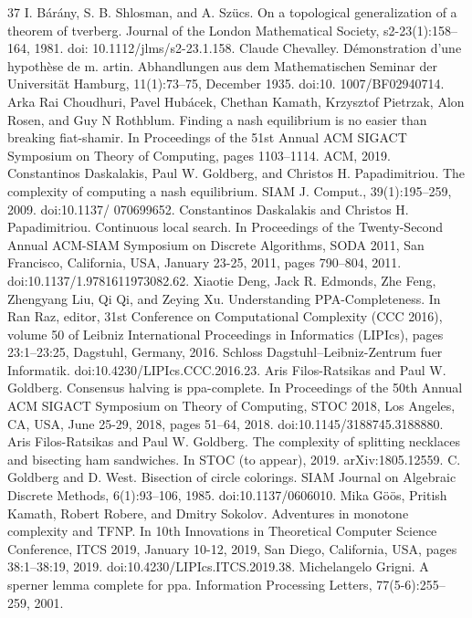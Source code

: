 \documentclass[10pt,a4paper]{article}
\theoremstyle{definition}
\theoremstyle{remark}
\begin{document}
\begin{thebibliography}{37}
 I. Bárány, S. B. Shlosman, and A. Szücs. On a topological generalization of a theorem of tverberg. Journal of the London Mathematical Society, s2-23(1):158–164, 1981. doi: 10.1112/jlms/s2-23.1.158.
 Claude Chevalley. Démonstration d’une hypothèse de m. artin. Abhandlungen aus dem Mathematischen Seminar der Universität Hamburg, 11(1):73–75, December 1935. doi:10. 1007/BF02940714.
 Arka Rai Choudhuri, Pavel Hubácek, Chethan Kamath, Krzysztof Pietrzak, Alon Rosen, and Guy N Rothblum. Finding a nash equilibrium is no easier than breaking fiat-shamir. In Proceedings of the 51st Annual ACM SIGACT Symposium on Theory of Computing, pages 1103–1114. ACM, 2019.
 Constantinos Daskalakis, Paul W. Goldberg, and Christos H. Papadimitriou. The complexity of computing a nash equilibrium. SIAM J. Comput., 39(1):195–259, 2009. doi:10.1137/ 070699652.
 Constantinos Daskalakis and Christos H. Papadimitriou. Continuous local search. In Proceedings of the Twenty-Second Annual ACM-SIAM Symposium on Discrete Algorithms, SODA 2011, San Francisco, California, USA, January 23-25, 2011, pages 790–804, 2011. doi:10.1137/1.9781611973082.62.
 Xiaotie Deng, Jack R. Edmonds, Zhe Feng, Zhengyang Liu, Qi Qi, and Zeying Xu. Understanding PPA-Completeness. In Ran Raz, editor, 31st Conference on Computational Complexity (CCC 2016), volume 50 of Leibniz International Proceedings in Informatics (LIPIcs), pages 23:1–23:25, Dagstuhl, Germany, 2016. Schloss Dagstuhl–Leibniz-Zentrum fuer Informatik. doi:10.4230/LIPIcs.CCC.2016.23.
 Aris Filos-Ratsikas and Paul W. Goldberg. Consensus halving is ppa-complete. In Proceedings of the 50th Annual ACM SIGACT Symposium on Theory of Computing, STOC 2018, Los Angeles, CA, USA, June 25-29, 2018, pages 51–64, 2018. doi:10.1145/3188745.3188880.
 Aris Filos-Ratsikas and Paul W. Goldberg. The complexity of splitting necklaces and bisecting ham sandwiches. In STOC (to appear), 2019. arXiv:1805.12559.
 C. Goldberg and D. West. Bisection of circle colorings. SIAM Journal on Algebraic Discrete Methods, 6(1):93–106, 1985. doi:10.1137/0606010.
 Mika Göös, Pritish Kamath, Robert Robere, and Dmitry Sokolov. Adventures in monotone complexity and TFNP. In 10th Innovations in Theoretical Computer Science Conference, ITCS 2019, January 10-12, 2019, San Diego, California, USA, pages 38:1–38:19, 2019. doi:10.4230/LIPIcs.ITCS.2019.38.
 Michelangelo Grigni. A sperner lemma complete for ppa. Information Processing Letters, 77(5-6):255–259, 2001.

\end{thebibliography}
\end{document}
